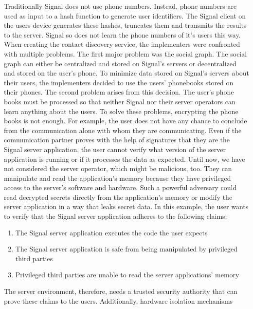 Traditionally Signal does not use phone numbers. Instead, phone numbers are used
as input to a hash function to generate user identifiers. The Signal client on
the users device generates these hashes, truncates them and transmits the
results to the server. Signal so does not learn the phone numbers of it's users
this way.
When creating the contact discovery service, the implementers were confronted
with multiple problems. The first major problem was the social graph. The social
graph can either be centralized and stored on Signal's servers or decentralized
and stored on the user's phone. To minimize data stored on Signal's servers
about their users, the implementers decided to use the users' phonebooks stored
on their phones. The second problem arises from this decision. The user's phone
books must be processed so that neither Signal nor their server operators can
learn anything about the users. To solve these problems, encrypting the phone
books is not enough. For example, the user does not have any chance to conclude
from the communication alone with whom they are communicating. Even if the
communication partner proves with the help of signatures that they are the
Signal server application, the user cannot verify what version of the server
application is running or if it processes the data as expected. Until now, we
have not considered the server operator, which might be malicious, too. They can
manipulate and read the application's memory because they have privileged access
to the server's software and hardware. Such a powerful adversary could read
decrypted secrets directly from the application's memory or modify the server
application in a way that leaks secret data. In this example, the user wants to
verify that the Signal server application adheres to the following claims:
\begin{enumerate}
    \item The Signal server application executes the code the user expects
    \item The Signal server application is safe from being manipulated by
          privileged third parties
    \item Privileged third parties are unable to read the server applications'
          memory
\end{enumerate}
The server environment, therefore, needs a trusted security authority that can
prove these claims to the users. Additionally, hardware isolation mechanisms
